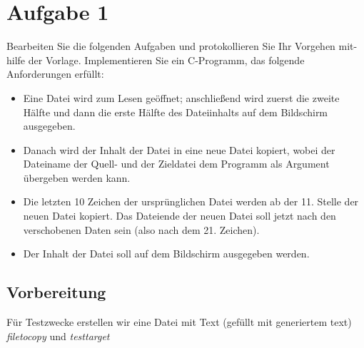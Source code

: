 \section{Aufgabe 1}
Bearbeiten Sie die folgenden Aufgaben und protokollieren Sie Ihr Vorgehen mit-
hilfe der Vorlage.
Implementieren Sie ein C-Programm, das folgende Anforderungen erfüllt:
\begin{itemize}
	\item Eine Datei wird zum Lesen geöffnet; anschließend wird zuerst die zweite
	Hälfte und dann die erste Hälfte des Dateiinhalts auf dem Bildschirm ausgegeben.
	\item  Danach wird der Inhalt der Datei in eine neue Datei kopiert, wobei der Dateiname der
Quell- und der Zieldatei dem Programm als Argument übergeben	werden kann.
\item  Die letzten 10 Zeichen der ursprünglichen Datei werden ab der 11. Stelle der neuen Datei
kopiert. Das Dateiende der neuen Datei soll jetzt nach den verschobenen Daten sein (also
nach dem 21. Zeichen).
\item Der Inhalt der Datei soll auf dem Bildschirm ausgegeben werden.


\end{itemize}

	\subsection{Vorbereitung}
	Für Testzwecke erstellen wir eine Datei mit Text (gefüllt mit generiertem text)
	\textit{filetocopy} und \textit{testtarget}
